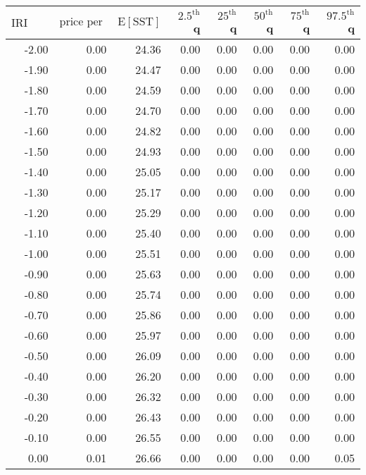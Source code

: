 \begin{table*}[ht]
\centering \footnotesize
\begin{tabular}{rrrrrrrr}
  \hline
$\mbox{IRI anom}$ & $\mbox{price per USD}$ & $\mbox{E}[\mbox{SST}]$ & $2.5^{\mbox{th}}$ q & $25^{\mbox{th}}$ q & $50^{\mbox{th}}$ q & $75^{\mbox{th}}$ q & $97.5^{\mbox{th}}$ q \\ 
  \hline
-2.00 & 0.00 & 24.36 & 0.00 & 0.00 & 0.00 & 0.00 & 0.00 \\ 
  -1.90 & 0.00 & 24.47 & 0.00 & 0.00 & 0.00 & 0.00 & 0.00 \\ 
  -1.80 & 0.00 & 24.59 & 0.00 & 0.00 & 0.00 & 0.00 & 0.00 \\ 
  -1.70 & 0.00 & 24.70 & 0.00 & 0.00 & 0.00 & 0.00 & 0.00 \\ 
  -1.60 & 0.00 & 24.82 & 0.00 & 0.00 & 0.00 & 0.00 & 0.00 \\ 
  -1.50 & 0.00 & 24.93 & 0.00 & 0.00 & 0.00 & 0.00 & 0.00 \\ 
  -1.40 & 0.00 & 25.05 & 0.00 & 0.00 & 0.00 & 0.00 & 0.00 \\ 
  -1.30 & 0.00 & 25.17 & 0.00 & 0.00 & 0.00 & 0.00 & 0.00 \\ 
  -1.20 & 0.00 & 25.29 & 0.00 & 0.00 & 0.00 & 0.00 & 0.00 \\ 
  -1.10 & 0.00 & 25.40 & 0.00 & 0.00 & 0.00 & 0.00 & 0.00 \\ 
  -1.00 & 0.00 & 25.51 & 0.00 & 0.00 & 0.00 & 0.00 & 0.00 \\ 
  -0.90 & 0.00 & 25.63 & 0.00 & 0.00 & 0.00 & 0.00 & 0.00 \\ 
  -0.80 & 0.00 & 25.74 & 0.00 & 0.00 & 0.00 & 0.00 & 0.00 \\ 
  -0.70 & 0.00 & 25.86 & 0.00 & 0.00 & 0.00 & 0.00 & 0.00 \\ 
  -0.60 & 0.00 & 25.97 & 0.00 & 0.00 & 0.00 & 0.00 & 0.00 \\ 
  -0.50 & 0.00 & 26.09 & 0.00 & 0.00 & 0.00 & 0.00 & 0.00 \\ 
  -0.40 & 0.00 & 26.20 & 0.00 & 0.00 & 0.00 & 0.00 & 0.00 \\ 
  -0.30 & 0.00 & 26.32 & 0.00 & 0.00 & 0.00 & 0.00 & 0.00 \\ 
  -0.20 & 0.00 & 26.43 & 0.00 & 0.00 & 0.00 & 0.00 & 0.00 \\ 
  -0.10 & 0.00 & 26.55 & 0.00 & 0.00 & 0.00 & 0.00 & 0.00 \\ 
  0.00 & 0.01 & 26.66 & 0.00 & 0.00 & 0.00 & 0.00 & 0.05 \\ 

\end{tabular}
\end{table*}
